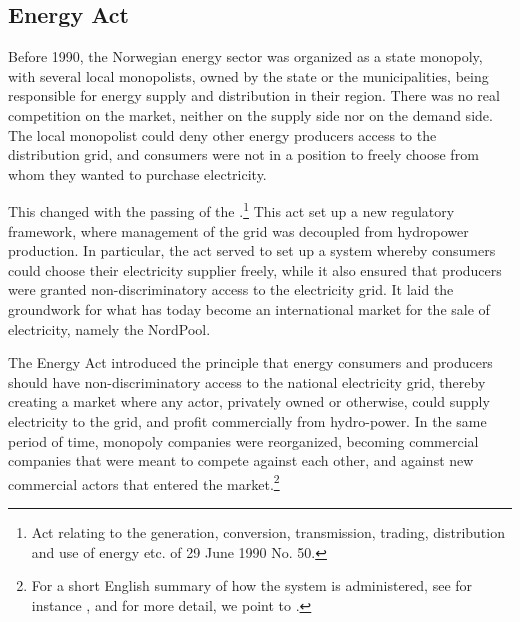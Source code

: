 \subsection{Energy Act}\label{sec:ea}

Before 1990, the Norwegian energy sector was organized as a state monopoly, with several local monopolists, owned by the state or the municipalities, being responsible for energy supply and distribution in their region. There was no real competition on the market, neither on the supply side nor on the demand side. The local monopolist could deny other energy producers access to the distribution grid, and consumers were not in a position to freely choose from whom they wanted to purchase electricity.

This changed with the passing of the \cite{ea90}.\footnote{Act relating to the generation, conversion, transmission, trading, distribution and use of energy etc. of 29 June 1990 No. 50.} This act set up a new regulatory framework, where management of the grid was decoupled from hydropower production. In particular, the act served to set up a system whereby consumers could choose their electricity supplier freely, while it also ensured that producers were granted non-discriminatory access to the electricity grid. It laid the groundwork for what has today become an international market for the sale of electricity, namely the NordPool. 

The Energy Act introduced the principle that energy consumers and producers should have non-discriminatory access to the national electricity grid, thereby creating a market where any actor, privately owned or otherwise, could supply electricity to the grid, and profit commercially from hydro-power. In the same period of time, monopoly companies were reorganized, becoming commercial companies that were meant to compete against each other, and against new commercial actors that entered the market.\footnote{For a short English summary of how the system is administered, see for instance \cite[p.29-30]{ar2010}, and for more detail, we point to \cite{Hammer2}.}

